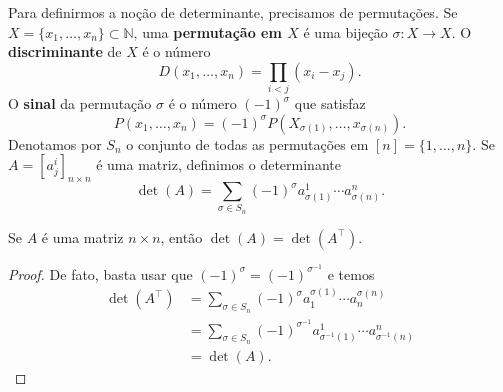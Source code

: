 Para definirmos a noção de determinante, precisamos de permutações. Se $X = \{x_1, \dots, x_n\} \subset \mathbb{N}$, uma \textbf{permutação em $X$} é uma bijeção $\sigma \colon X \to X$. O \textbf{discriminante} de $X$ é o número \begin{equation}
    D(x_1, \dots, x_n) = \prod_{i < j} (x_i - x_j).
\end{equation} O \textbf{sinal} da permutação $\sigma$ é o número $(-1)^\sigma$ que satisfaz \begin{equation}
    P(x_1, \dots, x_n) = (-1)^\sigma P(X_{\sigma(1)}, \dots, x_{\sigma(n)}).
\end{equation} Denotamos por $S_n$ o conjunto de todas as permutações em $[n] = \{1, \dots, n\}$. Se $A = [a^i_j]_{n \times n}$ é uma matriz, definimos o determinante \begin{equation}
    \det(A) = \sum_{\sigma \in S_n} (-1)^\sigma a^1_{\sigma(1)} \cdots a^n_{\sigma(n)}.
\end{equation}

\begin{proposition}\label{prop31}
    Se $A$ é uma matriz $n \times n$, então $\det(A) = \det(A^\top)$.
\end{proposition}
\begin{proof}
    De fato, basta usar que $(-1)^\sigma = (-1)^{\sigma^{-1}}$ e temos \begin{align}
        \det(A^\top) &= \sum_{\sigma \in S_n} (-1)^\sigma a^{\sigma(1)}_1 \cdots a^{\sigma(n)}_n \\ &= \sum_{\sigma \in S_n} (-1)^{\sigma^{-1}} a^1_{\sigma^{-1}(1)} \cdots a^n_{\sigma^{-1}(n)} \\ &= \det(A).
    \end{align}
\end{proof}

